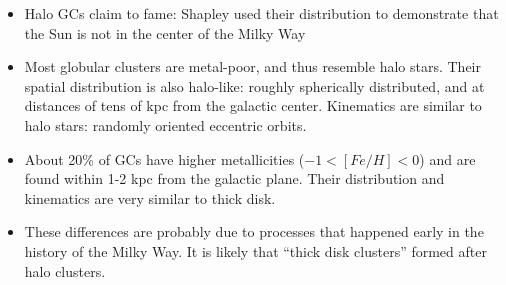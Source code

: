 \documentclass[letterpaper,landscape]{slides}
\begin{document}
\begin{slide}
{\begin{minipage}[t]{17cm}
			
			\begin{itemize}
				\item
				Halo GCs claim to fame: Shapley used their distribution to
				demonstrate that the Sun is not in the center of the Milky Way
				\item {\color{blue} Most globular clusters are metal-poor}, and thus resemble halo stars. 
				Their spatial distribution is also halo-like: roughly spherically distributed,
				and at distances of tens of kpc from the galactic center. Kinematics are
				similar to halo stars: randomly oriented eccentric orbits. 
				\item 
				{\color{blue} About 20\% of GCs have higher metallicities ($-1 < [Fe/H] < 0$)} and are
				found within 1-2 kpc from the galactic plane. Their distribution and 
				kinematics are very similar to thick disk.
				\item
				These differences are probably due to processes that happened early in the
				history of the Milky Way. It is likely that ``thick disk clusters'' formed
				after halo clusters. 
			\end{itemize}
			
	\end{minipage}}
	\vfill 
\end{slide}


%	
%				
%				
%				
%		
%			
%			
%			
\end{document}
